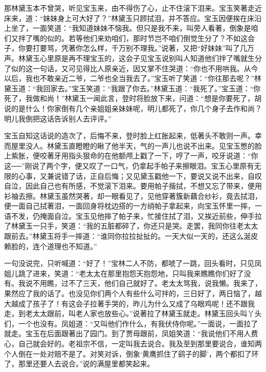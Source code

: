 \begin{parag}


    那林黛玉本不曾哭，听见宝玉来，由不得伤了心，止不住滚下泪来。宝玉笑著走近床来，道：“妹妹身上可大好了？”林黛玉只顾拭泪，并不答应。宝玉因便挨在床沿上坐了，一面笑道：“我知道妹妹不恼我。但只是我不来，叫旁人看著，倒象是咱们又拌了嘴的似的。若等他们来劝咱们，那时节岂不咱们倒觉生分了？不如这会子，你要打要骂，凭著你怎么样，千万别不理我。”说著，又把“好妹妹”叫了几万声。林黛玉心里原是再不理宝玉的，这会子见宝玉说别叫人知道他们拌了嘴就生分了似的这一句话，又可见得比人原亲近，因又掌不住哭道：“你也不用哄我。从今以后，我也不敢亲近二爷，二爷也全当我去了。”宝玉听了笑道：“你往那去呢？”林黛玉道：“我回家去。”宝玉笑道：“我跟了你去。”林黛玉道：“我死了。”宝玉道：“你死了，我做和尚！”林黛玉一闻此言，登时将脸放下来，问道：“想是你要死了，胡说的是什么！你家倒有几个亲姐姐亲妹妹呢，明儿都死了，你几个身子去作和尚？明儿我倒把这话告诉别人去评评。”
\end{parag}


\begin{parag}


    宝玉自知这话说的造次了，后悔不来，登时脸上红胀起来，低著头不敢则一声。幸而屋里没人。林黛玉直瞪瞪的瞅了他半天，气的一声儿也说不出来。见宝玉憋的脸上紫胀，便咬著牙用指头狠命的在他额颅上戳了一下，哼了一声，咬牙说道：“你这──”刚说了两个字，便又叹了一口气，仍拿起手帕子来擦眼泪。宝玉心里原有无限的心事，又兼说错了话，正自后悔；又见黛玉戳他一下，要说又说不出来，自叹自泣，因此自己也有所感，不觉滚下泪来。要用帕子揩拭，不想又忘了带来，便用衫袖去擦。林黛玉虽然哭著，却一眼看见了，见他穿著簇新藕合纱衫，竟去拭泪，便一面自己拭著泪，一面回身将枕边搭的一方绡帕子拿起来，向宝玉怀里一摔，一语不发，仍掩面自泣。宝玉见他摔了帕子来，忙接住拭了泪，又挨近前些，伸手拉了林黛玉一只手，笑道：“我的五脏都碎了，你还只是哭。走罢，我同你往老太太跟前去。”林黛玉将手一摔道：“谁同你拉拉扯扯的。一天大似一天的，还这么涎皮赖脸的，连个道理也不知道。”
\end{parag}


\begin{parag}


    一句没说完，只听喊道：“好了！”宝林二人不防，都唬了一跳，回头看时，只见凤姐儿跳了进来，笑道：“老太太在那里抱怨天抱怨地，只叫我来瞧瞧你们好了没有。我说不用瞧，过不了三天，他们自己就好了。老太太骂我，说我懒。我来了，果然应了我的话了。也没见你们两个人有些什么可拌的，三日好了，两日恼了，越大越成了孩子了！有这会子拉著手哭的，昨儿为什么又成了乌眼鸡呢！还不跟我走，到老太太跟前，叫老人家也放些心。”说著拉了林黛玉就走。林黛玉回头叫丫头们，一个也没有。凤姐道：“又叫他们作什么，有我伏侍你呢。”一面说，一面拉了就走。宝玉在后面跟著出了园门。到了贾母跟前，凤姐笑道：“我说他们不用人费心，自己就会好的。老祖宗不信，一定叫我去说合。我及至到那里要说合，谁知两个人倒在一处对赔不是了。对笑对诉，倒象‘黄鹰抓住了鹞子的脚’，两个都扣了环了，那里还要人去说合。”说的满屋里都笑起来。
\end{parag}


